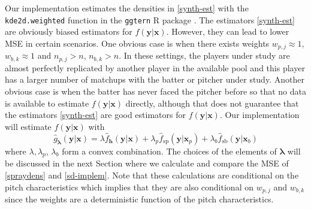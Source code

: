 \documentclass[11pt]{article}
\newcommand{\y}{\textbf{y}}
\newcommand{\x}{\textbf{x}}
\newcommand{\h}{\textbf{h}}
\newcommand{\wstar}{w^{\textstyle{*}}}
\newcommand{\lambdabf}{\boldsymbol{\lambda}}
\begin{document}

Our implementation estimates the densities in \eqref{synth-est} with the \texttt{kde2d.weighted} function in the \texttt{ggtern} R package \citep{ggtern}. The estimators \eqref{synth-est} are obviously biased estimators for $f(\y|\x)$. However, they can lead to lower MSE in certain scenarios. One obvious case is when there exists weights $w_{p,j} \approx 1$, $w_{b,k} \approx 1$  and $n_{p,j} > n$, $n_{b,k} > n$. In these settings, the players under study are almost perfectly replicated by another player in the available pool and this player has a larger number of matchups with the batter or pitcher under study. Another obvious case is when the batter has never faced the pitcher before so that no data is available to estimate $f(\y|\x)$ directly, although that does not guarantee that the estimators \eqref{synth-est} are good estimators for $f(\y|\x)$. Our implementation will estimate $f(\y|\x)$ with
\begin{equation} \label{sd-implem}
  \hat{g}_{\lambdabf}(\y|\x) = \lambda \hat f_\h(\y|\x) 
    + \lambda_p \hat f_{\text{sp}}(\y|\x_p) 
    + \lambda_b \hat f_{\text{sb}}(\y|\x_b)
\end{equation}
where $\lambda,\lambda_p$, $\lambda_b$ form a convex combination. The choices of the elements of $\lambdabf$ will be discussed in the next Section where we calculate and compare the MSE of \eqref{spraydens} and \eqref{sd-implem}. Note that these calculations are conditional on the pitch characteristics which implies that they are also conditional on $w_{p,j}$ and $w_{b,k}$ since the weights are a deterministic function of the pitch characteristics.
\end{document}
